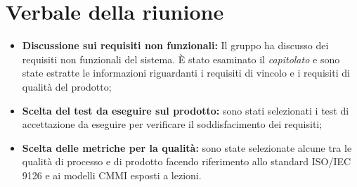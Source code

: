 \section{Verbale della riunione}
	\begin{itemize}
		\item \textbf{Discussione sui requisiti non funzionali:} Il gruppo ha discusso dei requisiti non funzionali del sistema. È stato esaminato il \textit{capitolato\glo} e sono state estratte le informazioni riguardanti i requisiti di vincolo e i requisiti di qualità del prodotto;
		\item \textbf{Scelta del test da eseguire sul prodotto:} sono stati selezionati i test di accettazione da eseguire per verificare il soddisfacimento dei requisiti;
		\item \textbf{Scelta delle metriche per la qualità:} sono state selezionate alcune tra le qualità di processo e di prodotto facendo riferimento allo standard ISO/IEC 9126 e ai modelli CMMI esposti a lezioni.
	\end{itemize}
